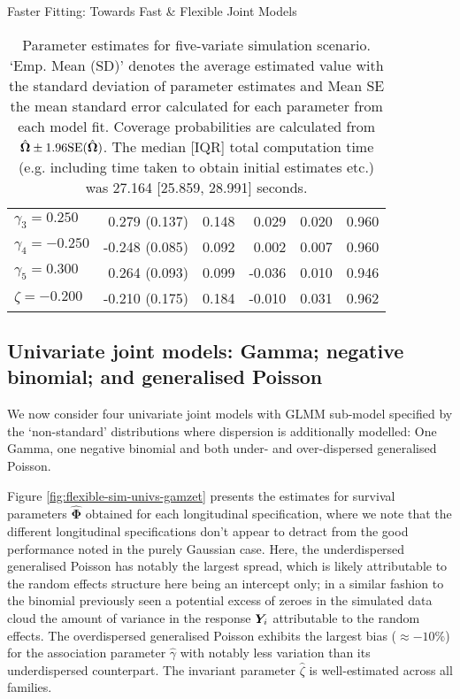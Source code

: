 \begin{chapter}{\label{cha:flexible}Faster Fitting: Towards Fast \& Flexible Joint Models}
\begin{table}[ht]
\begin{tabular}{l|rrrrr}
  $\gamma_3= 0.250$ &  0.279 (0.137) & 0.148 &  0.029 & 0.020 & 0.960 \\ 
  $\gamma_4=-0.250$ & -0.248 (0.085) & 0.092 &  0.002 & 0.007 & 0.960 \\ 
  $\gamma_5= 0.300$ &  0.264 (0.093) & 0.099 & -0.036 & 0.010 & 0.946 \\ 
  $\zeta=-0.200$ & -0.210 (0.175) & 0.184 & -0.010 & 0.031 & 0.962 \\ 
   \hline
\end{tabular}
\caption{Parameter estimates for five-variate simulation scenario. `Emp. Mean (SD)' denotes the average estimated value with the standard deviation of parameter estimates and Mean SE the mean standard error calculated for each parameter from each model fit. Coverage probabilities are calculated from $\hat{\bm{\Omega}}\pm1.96\mathrm{SE}(\hat{\bm{\Omega}})$. The median [IQR] total computation time (e.g. including time taken to obtain initial estimates etc.) was 27.164 [25.859, 28.991] seconds.} 
\label{tab:flexible-fivevariate}
\end{table}

\subsection{Univariate joint models: Gamma; negative binomial; and generalised Poisson}\label{sec:flexible-sim-univs}
We now consider four univariate joint models with GLMM sub-model specified by the `non-standard' distributions where dispersion is additionally modelled: One Gamma, one negative binomial and both under- and over-dispersed generalised Poisson.

Figure \ref{fig:flexible-sim-univs-gamzet} presents the estimates for survival parameters $\hat{\bm{\Phi}}$ obtained for each longitudinal specification, where we note that the different longitudinal specifications don't appear to detract from the good performance noted in the purely Gaussian case. Here, the underdispersed generalised Poisson has notably the largest spread, which is likely attributable to the random effects structure here being an intercept only; in a similar fashion to the binomial previously seen a potential excess of zeroes in the simulated data cloud the amount of variance in the response $\bm{Y}_i$ attributable to the random effects. The overdispersed generalised Poisson exhibits the largest bias ($\approx-10\%$) for the association parameter $\hat{\gamma}$ with notably less variation than its underdispersed counterpart. The invariant parameter $\hat{\zeta}$ is well-estimated across all families. 


\end{chapter}
